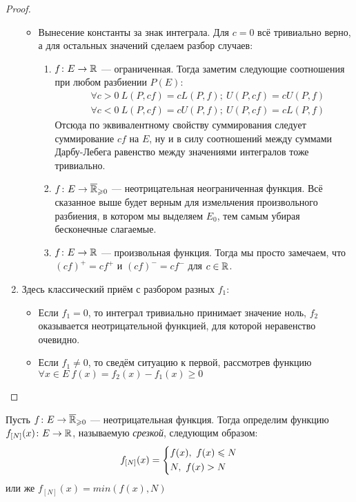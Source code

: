\begin{proof}
\begin{enumerate}
\begin{itemize}
			\item Вынесение константы за знак интеграла. Для $c = 0$ всё тривиально верно, а для остальных значений сделаем разбор случаев:
			\begin{enumerate}
				\item $f \colon E \to \mathbb{R}$ --- ограниченная. Тогда заметим следующие соотношения при любом разбиении $P(E)$:
				\begin{align*}
					&{\forall c > 0\ L(P, cf) = cL(P, f);\ U(P, cf) = cU(P, f)}
					\\
					&{\forall c < 0\ L(P, cf) = cU(P, f);\ U(P, cf) = cL(P, f)}
				\end{align*}
				Отсюда по эквивалентному свойству суммирования следует суммирование $cf$ на $E$, ну и в силу соотношений между суммами Дарбу-Лебега равенство между значениями интегралов тоже тривиально.
				
				\item $f \colon E \to \overline{\mathbb{R}}_{\geqslant 0}$ --- неотрицательная неограниченная функция. Всё сказанное выше будет верным для измельчения произвольного разбиения, в котором мы выделяем $E_0$, тем самым убирая бесконечные слагаемые.
				
				\item $f \colon E \to \mathbb{R}$ --- произвольная функция. Тогда мы просто замечаем, что $(cf)^+ = cf^+$ и $(cf)^- = cf^-$ для $c \in \mathbb{R}$.
			\end{enumerate}
		\end{itemize}
	
		\item Здесь классический приём с разбором разных $f_1$:
		\begin{itemize}
			\item Если $f_1 = 0$, то интеграл тривиально принимает значение ноль, $f_2$ оказывается неотрицательной функцией, для которой неравенство очевидно.
			
			\item Если $f_1 \neq 0$, то сведём ситуацию к первой, рассмотрев функцию $\forall x \in E\ f(x) = f_2(x) - f_1(x) \ge 0$
		\end{itemize}
	\end{enumerate}
\end{proof}

\begin{definition}
	Пусть $f \colon E \to \overline{\mathbb{R}}_{\geqslant 0}$ --- неотрицательная функция. Тогда определим функцию $f_{[N]}(x) \colon E \to \mathbb{R}$, называемую \textit{срезкой}, следующим образом:
	\[
		f_{[N]}(x) = \left\{\begin{aligned}
			&{f(x),\ f(x) \leqslant N}
			\\
			&{N,\ f(x) > N}
		\end{aligned}\right.
	\]
	или же $f_{[N]}(x) = min(f(x), N)$
\end{definition}

